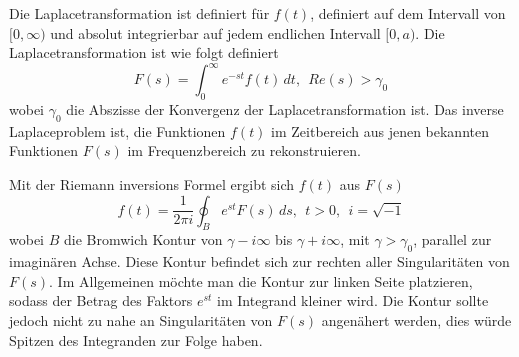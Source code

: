 %
%
%
Die Laplacetransformation ist definiert für $f(t)$, definiert auf dem Intervall von $[0, \infty)$ und absolut integrierbar auf jedem endlichen Intervall $[0, a)$. 
Die Laplacetransformation ist wie folgt definiert
\[
F(s) = \int_0^\infty e^{-st}f(t)\,dt,~~Re(s)>\gamma_{0}
\]
wobei $\gamma_{0}$ die Abszisse der Konvergenz der Laplacetransformation ist. 
Das inverse Laplaceproblem ist, die Funktionen $f(t)$ im Zeitbereich aus jenen bekannten Funktionen $F(s)$ im Frequenzbereich zu rekonstruieren.

Mit der Riemann inversions Formel ergibt sich $f(t)$ aus $F(s)$
\[
f(t) = \frac{1}{2\pi i} \oint_{B} e^{st}F(s)\,ds,~~t>0,~~i=\sqrt{-1}
\]
wobei $B$ die Bromwich Kontur von $\gamma-i\infty$ bis $\gamma+i\infty$, mit $\gamma>\gamma_{0}$, parallel zur imaginären Achse.
Diese Kontur befindet sich zur rechten aller Singularitäten von $F(s)$.
Im Allgemeinen möchte man die Kontur zur linken Seite platzieren, sodass der Betrag des Faktors $e^{st}$ im Integrand kleiner wird.
Die Kontur sollte jedoch nicht zu nahe an Singularitäten von $F(s)$ angenähert werden, dies würde Spitzen des Integranden zur Folge haben.

